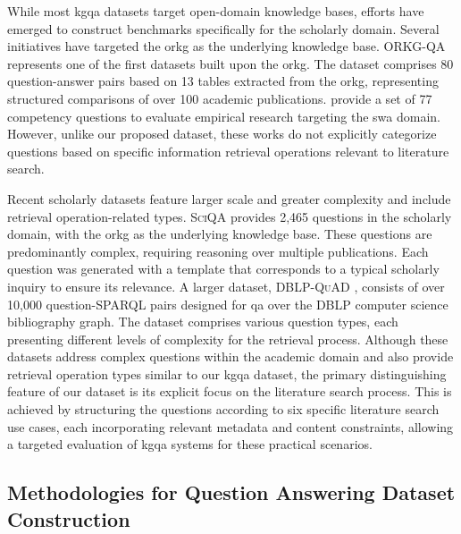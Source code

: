 While most \gls{kgqa} datasets target open-domain knowledge bases, efforts have emerged to construct benchmarks specifically for the scholarly domain. Several initiatives have targeted the \gls{orkg} as the underlying knowledge base. \textsc{ORKG-QA} \cite{jaradeh_question_2020} represents one of the first datasets built upon the \gls{orkg}. The dataset comprises 80 question-answer pairs based on 13 tables extracted from the \gls{orkg}, representing structured comparisons of over 100 academic publications. \textcite{karras_divide_2023} provide a set of 77 competency questions to evaluate empirical research targeting the \gls{swa} domain. However, unlike our proposed dataset, these works do not explicitly categorize questions based on specific information retrieval operations relevant to literature search.

Recent scholarly datasets feature larger scale and greater complexity and include retrieval operation-related types. \textsc{SciQA} \cite{auer_sciqa_2023} provides 2,465 questions in the scholarly domain, with the \gls{orkg} as the underlying knowledge base. These questions are predominantly complex, requiring reasoning over multiple publications. Each question was generated with a template that corresponds to a typical scholarly inquiry to ensure its relevance. A larger dataset, \textsc{DBLP-QuAD} \cite{banerjee_dblp-quad_2023}, consists of over 10,000 question-SPARQL pairs designed for \gls{qa} over the DBLP computer science bibliography graph. The dataset comprises various question types, each presenting different levels of complexity for the retrieval process. Although these datasets address complex questions within the academic domain and also provide retrieval operation types similar to our \gls{kgqa} dataset, the primary distinguishing feature of our dataset is its explicit focus on the literature search process. This is achieved by structuring the questions according to six specific literature search use cases, each incorporating relevant metadata and content constraints, allowing a targeted evaluation of \gls{kgqa} systems for these practical scenarios.



\subsection[Methodologies for QA Dataset Construction]{Methodologies for Question Answering Dataset Construction}

